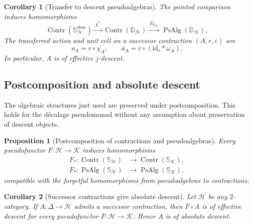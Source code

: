 \documentclass[11pt,a4paper]{article}
\numberwithin{equation}{section}
\newtheorem{proposition}[proposition]{Proposition}
\newtheorem{corollary}[corollary]{Corollary}
\theoremstyle{definition}
\theoremstyle{remark}
\newcommand{\id}{\mathrm{id}}
\newcommand{\Hcat}{\mathcal H}
\newcommand{\Kcat}{\mathcal K}
\newcommand{\Dmon}{\mathbb D}
\newcommand{\Smon}{\mathbb S}
\newcommand{\Contr}{\operatorname{Contr}}
\newcommand{\PsAlg}{\operatorname{PsAlg}}
\begin{document}
\begin{corollary}[Transfer to descent pseudoalgebras]
\label{cor:successor-descent-algebra}
The pointed comparison induces homomorphisms
\begin{equation}
  \Contr(\Smon_{\Hcat}^{\mathrm{desc}})
  \xrightarrow{\ \chi^*\ }
  \Contr(\Dmon_{\Hcat})
  \xrightarrow{\ E_{\Dmon_{\Hcat}}\ }
  \PsAlg(\Dmon_{\Hcat}),
  \label{eq:relative-descent-transfer}
\end{equation}
The transferred action and unit cell on a successor contraction
$(A,r,\varepsilon)$ are
\begin{equation}
  a_A=r\circ\chi_A,
  \qquad
  \bar a_A=\varepsilon\circ(\id_r\ast\omega_A).
  \label{eq:transferred-descent-action}
\end{equation}
In particular, $A$ is of effective $j$-descent.
\end{corollary}

\subsection{Postcomposition and absolute descent}

The algebraic structures just used are preserved under
postcomposition. This holds for the d\'ecalage pseudomonad without
any assumption about preservation of descent objects.

\begin{proposition}[Postcomposition of contractions and pseudoalgebras]
\label{prop:postcomposition-successor}
Every pseudofunctor $F\colon\Hcat\to\Kcat$ induces homomorphisms
\begin{equation}
\begin{aligned}
  F_*\colon\Contr(\Smon_{\Hcat})
       &\longrightarrow\Contr(\Smon_{\Kcat}),\\
  F_*\colon\PsAlg(\Smon_{\Hcat})
       &\longrightarrow\PsAlg(\Smon_{\Kcat}),
\end{aligned}
\label{eq:postcomposition-successor-algebras}
\end{equation}
compatible with the forgetful homomorphisms from pseudoalgebras to
contractions.
\end{proposition}

\begin{corollary}[Successor contractions give absolute descent]
\label{thm:absolute-descent}
Let $\Hcat$ be any $2$-category. If
$A\colon\dot\Delta\to\Hcat$ admits a successor contraction, then
$F\circ A$ is of effective descent for every pseudofunctor
$F\colon\Hcat\to\Kcat$. Hence $A$ is of absolute descent.
\end{corollary}
\end{document}
